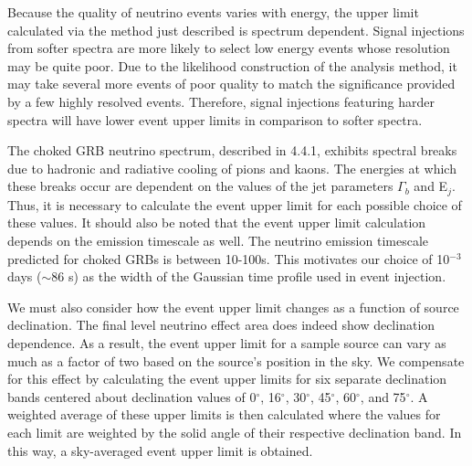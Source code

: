 \documentclass{gatech-thesis}
\begin{document}
Because the quality of neutrino events varies with energy, the upper limit calculated via the method just described is spectrum dependent. Signal injections from softer spectra are more likely to select low energy events whose resolution may be quite poor. Due to the likelihood construction of the analysis method, it may take several more events of poor quality to match the significance provided by a few highly resolved events. Therefore, signal injections featuring harder spectra will have lower event upper limits in comparison to softer spectra.

The choked GRB neutrino spectrum, described in 4.4.1, exhibits spectral breaks due to hadronic and radiative cooling of pions and kaons. The energies at which these breaks occur are dependent on the values of the jet parameters $\Gamma_b$ and E$_j$. Thus, it is necessary to calculate the event upper limit for each possible choice of these values. It should also be noted that the event upper limit calculation depends on the emission timescale as well. The neutrino emission timescale predicted for choked GRBs is between 10-100s. This motivates our choice of 10$^{-3}$ days ($\sim$86 s) as the width of the Gaussian time profile used in event injection.

We must also consider how the event upper limit changes as a function of source declination. The final level neutrino effect area does indeed show declination dependence. As a result, the event upper limit for a sample source can vary as much as a factor of two based on the source's position in the sky. We compensate for this effect by calculating the event upper limits for six separate declination bands centered about declination values of 0$^{\circ}$, 16$^{\circ}$, 30$^{\circ}$, 45$^{\circ}$, 60$^{\circ}$, and 75$^{\circ}$. A weighted average of these upper limits is then calculated where the values for each limit are weighted by the solid angle of their respective declination band. In this way, a sky-averaged event upper limit is obtained.
\end{document}
